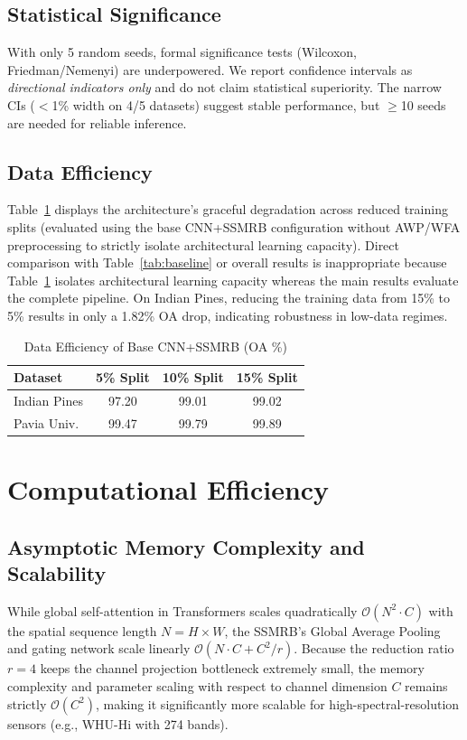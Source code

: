 \documentclass[pdflatex,sn-mathphys-num]{sn-jnl}
\theoremstyle{thmstyleone}
\theoremstyle{thmstyletwo}
\theoremstyle{thmstylethree}
\begin{document}
\subsection{Statistical Significance}
With only 5 random seeds, formal significance tests (Wilcoxon, Friedman/Nemenyi) are underpowered. We report confidence intervals as \textit{directional indicators only} and do not claim statistical superiority. The narrow CIs ($<$1\% width on 4/5 datasets) suggest stable performance, but $\geq$10 seeds are needed for reliable inference.

\subsection{Data Efficiency}

Table~\ref{tab:data_eff} displays the architecture's graceful degradation across reduced training splits (evaluated using the base CNN+SSMRB configuration without AWP/WFA preprocessing to strictly isolate architectural learning capacity). Direct comparison with Table~\ref{tab:baseline} or overall results is inappropriate because Table~\ref{tab:data_eff} isolates architectural learning capacity whereas the main results evaluate the complete pipeline. On Indian Pines, reducing the training data from 15\% to 5\% results in only a 1.82\% OA drop, indicating robustness in low-data regimes.

\begin{table}[!h]
\caption{Data Efficiency of Base CNN+SSMRB (OA \%)}
\label{tab:data_eff}
\centering
\begin{tabular}{lccc}
\toprule
\textbf{Dataset} & \textbf{5\% Split} & \textbf{10\% Split} & \textbf{15\% Split} \\
\midrule
Indian Pines & 97.20 & 99.01 & 99.02 \\
Pavia Univ. & 99.47 & 99.79 & 99.89 \\
\bottomrule
\end{tabular}
\end{table}

\section{Computational Efficiency}

\subsection{Asymptotic Memory Complexity and Scalability}
While global self-attention in Transformers scales quadratically $\mathcal{O}(N^2 \cdot C)$ with the spatial sequence length $N = H \times W$, the SSMRB's Global Average Pooling and gating network scale linearly $\mathcal{O}(N \cdot C + C^2 / r)$. Because the reduction ratio $r=4$ keeps the channel projection bottleneck extremely small, the memory complexity and parameter scaling with respect to channel dimension $C$ remains strictly $\mathcal{O}(C^2)$, making it significantly more scalable for high-spectral-resolution sensors (e.g., WHU-Hi with 274 bands).
\end{document}
